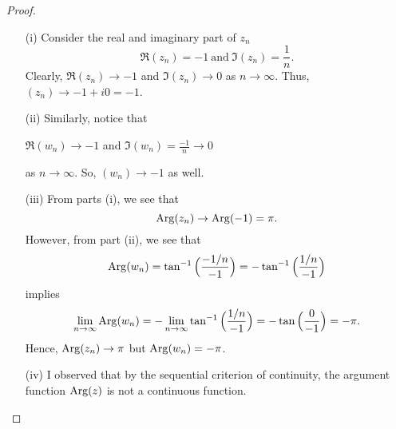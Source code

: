 \documentclass[a4paper]{article}
\begin{document}
\begin{proof}
    \begin{enumerate}
        \item[(i)] Consider the real and imaginary part of \( {z}_{n} \) 
            \[  \Re({z}_{n}) = -1 \ \text{and} \ \Im({z}_{n}) = \frac{ 1 }{ n }.  \]
            Clearly, \( \Re({z}_{n}) \to -1  \) and \( \Im({z}_{n}) \to 0  \) as \( n \to \infty  \). Thus, \( ({z}_{n}) \to -1 + i 0 = -1 \).
        \item[(ii)] Similarly, notice that 
            \begin{center}
                \( \Re({w}_{n}) \to -1 \) and \( \Im({w}_{n}) = \frac{ -1 }{ n }  \to 0   \)
            \end{center}
            as \( n \to \infty  \). So, \( ({w}_{n}) \to -1 \) as well.
        \item[(iii)] From parts (i), we see that
            \[  \operatorname{Arg}({z}_{n}) \to \operatorname{Arg}(-1) = \pi. \]
            However, from part (ii), we see that 
            \[  \operatorname{Arg}({w}_{n}) = \tan^{-1} \Big(  \frac{ -1/n }{ -1 }  \Big) = - \tan^{-1} \Big(  \frac{ 1/n }{ -1 }  \Big) \]
            implies
            \[  \lim_{ n \to \infty  }  \Arg({w}_{n}) = - \lim_{ n \to \infty   } \tan^{-1} \Big(  \frac{ 1/n }{ -1 }  \Big) = - \tan \Big(  \frac{ 0  }{ -1 }  \Big) = -\pi. \]
            Hence, \( \operatorname{Arg}({z}_{n}) \to \pi  \) but \( \operatorname{Arg}({w}_{n}) = - \pi \).
        \item[(iv)] I observed that by the sequential criterion of continuity, the argument function \( \operatorname{Arg}(z)  \) is not a continuous function.
    \end{enumerate}
\end{proof}
\end{document}
